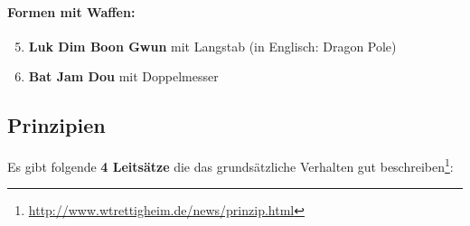 \documentclass[a4paper,12pt]{scrartcl}
\begin{document}
\paragraph{Formen mit Waffen:}
\begin{enumerate}
\setcounter{enumi}{4}
	\item \textbf{Luk Dim Boon Gwun} mit Langstab (in Englisch: Dragon Pole)
	\item \textbf{Bat Jam Dou} mit Doppelmesser
\end{enumerate}






\subsection{Prinzipien}\label{sec:prinzipien}

Es gibt folgende \textbf{4 Leits\"atze} die das grunds\"atzliche Verhalten gut beschreiben\footnote{\url{http://www.wtrettigheim.de/news/prinzip.html}}:


\end{document}
